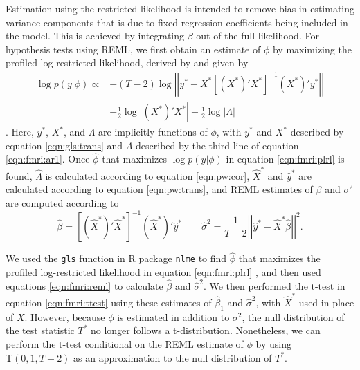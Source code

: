 Estimation using the restricted likelihood is intended to remove bias in estimating variance components that is due to fixed regression coefficients being included in the model. This is achieved by integrating $\beta$ out of the full likelihood. For hypothesis tests using REML, we first obtain an estimate of $\phi$ by maximizing the profiled log-restricted likelihood, derived by \citet{harville:reml:1977} and given by
\begin{align}
\log p(y|\phi) \propto & -(T-2)\log\left|\left| y^* - X^*\left[(X^*)'X^*\right]^{-1}(X^*)'y^* \right|\right| \label{eqn:fmri:plrl} \\
 & - \frac{1}{2}\log\left|(X^*)'X^*\right| - \frac{1}{2} \log |\Lambda| \nonumber
\end{align}
\citep[Page 205]{pin:bates:mixed:2000}. Here, $y^*$, $X^*$, and $\Lambda$ are implicitly functions of $\phi$, with $y^*$ and $X^*$ described by equation \eqref{eqn:gls:trans} and $\Lambda$ described by the third line of equation \eqref{eqn:fmri:ar1}. Once $\hat{\phi}$ that maximizes $\log p(y|\phi)$ in equation \eqref{eqn:fmri:plrl} is found, $\hat{\Lambda}$ is calculated according to equation \eqref{eqn:pw:cor}, $\hat{X}^*$ and $\hat{y}^*$ are calculated according to equation \eqref{eqn:pw:trans}, and REML estimates of $\beta$ and $\sigma^2$ are computed according to
\begin{equation}
\hat{\beta} = \left[(\hat{X}^*)'\hat{X}^*\right]^{-1}(\hat{X}^*)'\hat{y}^* \qquad \hat{\sigma}^2 = \frac{1}{T-2}\left|\left| \hat{y}^*-\hat{X}^*\hat{\beta} \right|\right|^2. \label{eqn:fmri:reml}
\end{equation}


We used the {\tt gls} function in R package {\tt nlme} to find $\hat{\phi}$ that maximizes the profiled log-restricted likelihood in equation \eqref{eqn:fmri:plrl} \citep{pin:bates:mixed:2000}, and then used equations \eqref{eqn:fmri:reml} to calculate $\hat{\beta}$ and $\hat{\sigma}^2$. We then performed the t-test in equation \eqref{eqn:fmri:ttest} using these estimates of $\hat{\beta}_1$ and $\hat{\sigma}^2$, with $\hat{X}^*$ used in place of $X$. However, because $\phi$ is estimated in addition to $\sigma^2$, the null distribution of the test statistic $T^*$ no longer follows a t-distribution. Nonetheless, we can perform the t-test conditional on the REML estimate of $\phi$ by using $\mbox{T}(0,1,T-2)$ as an approximation to the null distribution of $T^*$.

